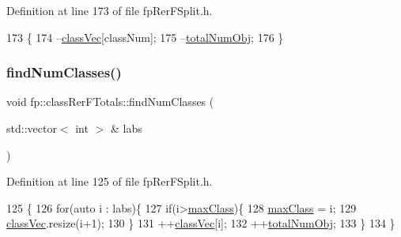 Definition at line 173 of file fp\+Rer\+F\+Split.\+h.


\begin{DoxyCode}
173                                                     \{
174                 --\hyperlink{classfp_1_1classRerFTotals_a4a7b583fc52d7631771f5dd04d20a68a}{classVec}[classNum];
175                 --\hyperlink{classfp_1_1classRerFTotals_a0963284a03586b3a25c284bdb35f9e44}{totalNumObj};
176             \}
\end{DoxyCode}
\mbox{\label{classfp_1_1classRerFTotals_a8956cc79012353b8a56c21cf79fe83d0}} 
\subsubsection{\texorpdfstring{find\+Num\+Classes()}{findNumClasses()}}
{\footnotesize\ttfamily void fp\+::class\+Rer\+F\+Totals\+::find\+Num\+Classes (\begin{DoxyParamCaption}\item[{std\+::vector$<$ int $>$ \&}]{labs }\end{DoxyParamCaption})\hspace{0.3cm}{\ttfamily [inline]}}



Definition at line 125 of file fp\+Rer\+F\+Split.\+h.


\begin{DoxyCode}
125                                                      \{
126                 \textcolor{keywordflow}{for}(\textcolor{keyword}{auto} i : labs)\{
127                     \textcolor{keywordflow}{if}(i>\hyperlink{classfp_1_1classRerFTotals_a365f8e9aca77f5794fa1bc5fdd504670}{maxClass})\{
128                         \hyperlink{classfp_1_1classRerFTotals_a365f8e9aca77f5794fa1bc5fdd504670}{maxClass} = i;
129                         \hyperlink{classfp_1_1classRerFTotals_a4a7b583fc52d7631771f5dd04d20a68a}{classVec}.resize(i+1);
130                     \}
131                     ++\hyperlink{classfp_1_1classRerFTotals_a4a7b583fc52d7631771f5dd04d20a68a}{classVec}[i];
132                     ++\hyperlink{classfp_1_1classRerFTotals_a0963284a03586b3a25c284bdb35f9e44}{totalNumObj};
133                 \}
134             \}
\end{DoxyCode}
\mbox{\label{classfp_1_1classRerFTotals_a1be2afa6bf6490104eac4c283abe62ef}} 
